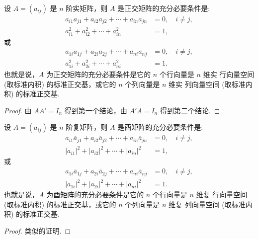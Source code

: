 \documentclass[../../main.tex]{subfiles}
\begin{document}
\begin{theorem}\label{theorem:正交矩阵的基本性质1}
设 $A = (a_{ij})$ 是 $n$ 阶实矩阵，则 $A$ 是正交矩阵的充分必要条件是:
\begin{align*}
a_{i1}a_{j1} + a_{i2}a_{j2} + \cdots + a_{in}a_{jn} &= 0,\quad i \neq j,\\
a_{i1}^2 + a_{i2}^2 + \cdots + a_{in}^2 &= 1,
\end{align*}
或
\begin{align*}
a_{1i}a_{1j} + a_{2i}a_{2j} + \cdots + a_{ni}a_{nj} &= 0,\quad i \neq j,\\
a_{1i}^2 + a_{2i}^2 + \cdots + a_{ni}^2 &= 1.
\end{align*}
也就是说，$A$ 为正交矩阵的充分必要条件是它的 $n$ 个行向量是 $n$ 维实 行向量空间 (取标准内积) 的标准正交基，或它的 $n$ 个列向量是 $n$ 维实 列向量空间 (取标准内积) 的标准正交基.
\end{theorem}
\begin{proof}
由 $AA' = I_n$ 得到第一个结论，由 $A'A = I_n$ 得到第二个结论.

\end{proof}

\begin{theorem}\label{theorem:酉矩阵的基本性质1}
设 $A = (a_{ij})$ 是 $n$ 阶复矩阵，则 $A$ 是酉矩阵的充分必要条件是:
\begin{align*}
a_{i1}\overline{a}_{j1} + a_{i2}\overline{a}_{j2} + \cdots + a_{in}\overline{a}_{jn} &= 0,\quad i \neq j,\\
|a_{i1}|^2 + |a_{i2}|^2 + \cdots + |a_{in}|^2 &= 1,
\end{align*}
或
\begin{align*}
a_{1i}\overline{a}_{1j} + a_{2i}\overline{a}_{2j} + \cdots + a_{ni}\overline{a}_{nj} &= 0,\quad i \neq j,\\
|a_{1i}|^2 + |a_{2i}|^2 + \cdots + |a_{ni}|^2 &= 1.
\end{align*}
也就是说，$A$ 为酉矩阵的充分必要条件是它的 $n$ 个行向量是 $n$ 维复 行向量空间 (取标准内积) 的标准正交基，或它的 $n$ 个列向量是 $n$ 维复 列向量空间 (取标准内积) 的标准正交基.
\end{theorem}
\begin{proof}
类似的证明.

\end{proof}
\end{document}
